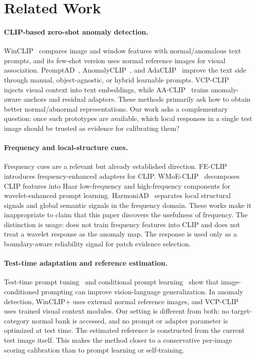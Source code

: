 \section{Related Work}
\label{sec:related_work}

\paragraph{CLIP-based zero-shot anomaly detection.}
WinCLIP~\cite{jeong2023winclip} compares image and window features with
normal/anomalous text prompts, and its few-shot version uses normal reference
images for visual association. PromptAD~\cite{li2024promptad},
AnomalyCLIP~\cite{zhou2024anomalyclip}, and AdaCLIP~\cite{cao2024adaclip}
improve the text side through manual, object-agnostic, or hybrid learnable
prompts. VCP-CLIP~\cite{qu2024vcpclip} injects visual context into text
embeddings, while AA-CLIP~\cite{ma2025aaclip} trains anomaly-aware anchors and
residual adapters. These methods primarily ask how to obtain better
normal/abnormal representations. Our work asks a complementary question: once
such prototypes are available, which local responses in a single test image
should be trusted as evidence for calibrating them?

\paragraph{Frequency and local-structure cues.}
Frequency cues are a relevant but already established direction. FE-CLIP~
\cite{gong2025feclip} introduces frequency-enhanced adapters for CLIP.
WMoE-CLIP~\cite{chen2026wmoeclip} decomposes CLIP features into Haar
low-frequency and high-frequency components for wavelet-enhanced prompt
learning. HarmoniAD~\cite{zhang2026harmoniad} separates local structural
signals and global semantic signals in the frequency domain. These works make
it inappropriate to claim that this paper discovers the usefulness of
frequency. The distinction is usage: \method{} does not train frequency
features into CLIP and does not treat a wavelet response as the anomaly map.
The response is used only as a boundary-aware reliability signal for patch
evidence selection.

\paragraph{Test-time adaptation and reference estimation.}
Test-time prompt tuning~\cite{shu2022tpt} and conditional prompt learning~
\cite{zhou2022cocoop} show that image-conditioned prompting can improve
vision-language generalization. In anomaly detection, WinCLIP+ uses external
normal reference images, and VCP-CLIP uses trained visual context modules. Our
setting is different from both: no target-category normal bank is accessed, and
no prompt or adapter parameter is optimized at test time. The estimated
reference is constructed from the current test image itself. This makes the
method closer to a conservative per-image scoring calibration than to prompt
learning or self-training.
